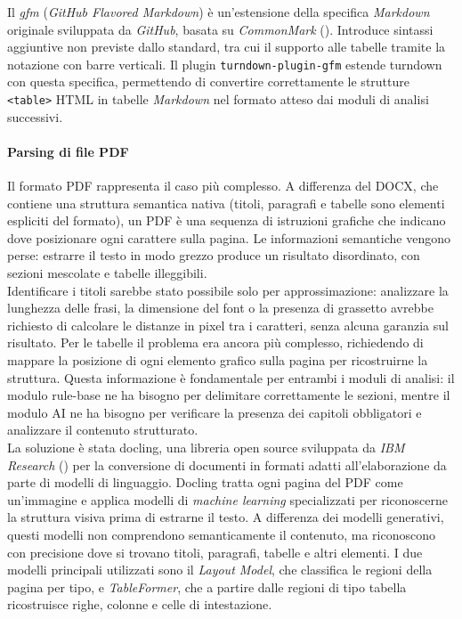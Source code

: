 Il \emph{gfm} (\emph{GitHub Flavored Markdown}) è un'estensione della specifica \emph{Markdown} originale sviluppata da \emph{GitHub}, basata su \emph{CommonMark} (\cite{site:gfm}). Introduce sintassi aggiuntive non previste dallo standard, tra cui il supporto alle tabelle tramite la notazione con barre verticali. Il plugin \texttt{turndown-plugin-gfm} estende \gls{turndown} con questa specifica, permettendo di convertire correttamente le strutture \texttt{<table>} HTML in tabelle \emph{Markdown} nel formato atteso dai moduli di analisi successivi.\\

\paragraph{Parsing di file PDF}
Il formato PDF rappresenta il caso più complesso. A differenza del DOCX, che contiene una struttura semantica nativa (titoli, paragrafi e tabelle sono elementi espliciti del formato), un PDF è una sequenza di istruzioni grafiche che indicano dove posizionare ogni carattere sulla pagina. Le informazioni semantiche vengono perse: estrarre il testo in modo grezzo produce un risultato disordinato, con sezioni mescolate e tabelle illeggibili.\\

Identificare i titoli sarebbe stato possibile solo per approssimazione: analizzare la lunghezza delle frasi, la dimensione del font o la presenza di grassetto avrebbe richiesto di calcolare le distanze in pixel tra i caratteri, senza alcuna garanzia sul risultato. Per le tabelle il problema era ancora più complesso, richiedendo di mappare la posizione di ogni elemento grafico sulla pagina per ricostruirne la struttura. Questa informazione è fondamentale per entrambi i moduli di analisi: il modulo rule-base ne ha bisogno per delimitare correttamente le sezioni, mentre il modulo AI ne ha bisogno per verificare la presenza dei capitoli obbligatori e analizzare il contenuto strutturato.\\

La soluzione è stata \gls{docling}, una libreria open source sviluppata da \emph{IBM Research} (\cite{site:docling}) per la conversione di documenti in formati adatti all'elaborazione da parte di modelli di linguaggio. Docling tratta ogni pagina del PDF come un'immagine e applica modelli di \emph{machine learning} specializzati per riconoscerne la struttura visiva prima di estrarne il testo. A differenza dei modelli generativi, questi modelli non comprendono semanticamente il contenuto, ma riconoscono con precisione dove si trovano titoli, paragrafi, tabelle e altri elementi. I due modelli principali utilizzati sono il \emph{Layout Model}, che classifica le regioni della pagina per tipo, e \emph{TableFormer}, che a partire dalle regioni di tipo tabella ricostruisce righe, colonne e celle di intestazione.

